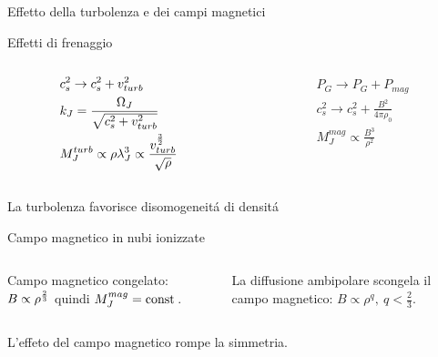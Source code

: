 \begin{frame}{Effetto della turbolenza e dei campi magnetici}

\begin{block}{Effetti di frenaggio}

\begin{columns}[T]
\begin{column}{0.5\textwidth}
\begin{align*}
&c_s^2\to c_s^2+v_{turb}^2\\
&k_J=\frac{\Omega_J}{\sqrt{c_s^2+v_{turb}^2}}\\
&M_J^{turb}\propto\rho\lambda_J^3\propto\frac{v_{turb}^{\frac{3}{2}}}{\sqrt{\rho}}
\end{align*}
\end{column}
\begin{column}{0.5\textwidth}
\begin{align*}
&P_G\to P_G+P_{mag}\\
&c_s^2\to c_s^2+\frac{B^2}{4\pi\rho_0}\\
&M_J^{mag}\propto\frac{B^3}{\rho^2}
\end{align*}

\end{column}
\end{columns}

\end{block}

\begin{block}{La turbolenza favorisce disomogeneit\'a di densit\'a}
\end{block}

\begin{block}{Campo magnetico in nubi ionizzate}

\begin{columns}[T]

\begin{column}{0.5\textwidth}
Campo magnetico congelato: $B\propto\rho^{\frac{2}{3}}$ quindi $M_J^{mag}=\operatorname{const}{}$.
\end{column}

\begin{column}{0.5\textwidth}
La diffusione ambipolare scongela il campo magnetico: $B\propto\rho^q,\ q<\frac{2}{3}$.
\end{column}

\end{columns}

\begin{block}{L'effeto del campo magnetico rompe la simmetria.}

\end{block}

\end{block}

\end{frame}

